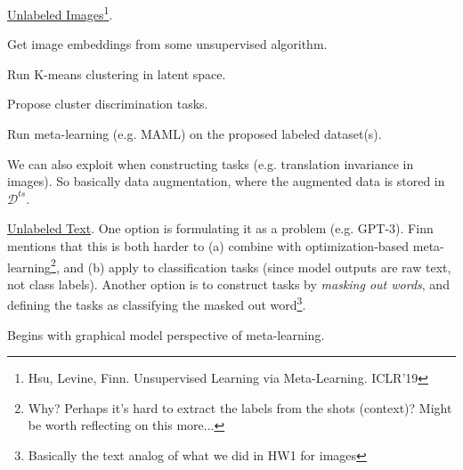 \documentclass[11pt]{article}
\begin{document}
\underline{Unlabeled Images}\footnote{Hsu, Levine, Finn. Unsupervised Learning via Meta-Learning. ICLR'19}. 
\begin{compactenum}
	\item Get image embeddings from some unsupervised algorithm.
	
	\item Run K-means clustering in latent space. 
	
	\item Propose cluster discrimination tasks. 
	
	\item Run meta-learning (e.g. MAML) on the proposed labeled dataset(s).
\end{compactenum}
We can also exploit  when constructing tasks (e.g. translation invariance in images). So basically data augmentation, where the augmented data is stored in $\mathcal{D}^{ts}$. 

\underline{Unlabeled Text}. One option is formulating it as a  problem (e.g. GPT-3). Finn mentions that this is both harder to (a) combine with optimization-based meta-learning\footnote{Why? Perhaps it's hard to extract the labels from the shots (context)? Might be worth reflecting on this more...}, and (b) apply to classification tasks (since model outputs are raw text, not class labels). Another option is to construct tasks by \textit{masking out words}, and defining the tasks as classifying the masked out word\footnote{Basically the text analog of what we did in HW1 for images}. 






Begins with graphical model perspective of meta-learning. 
\end{document}
